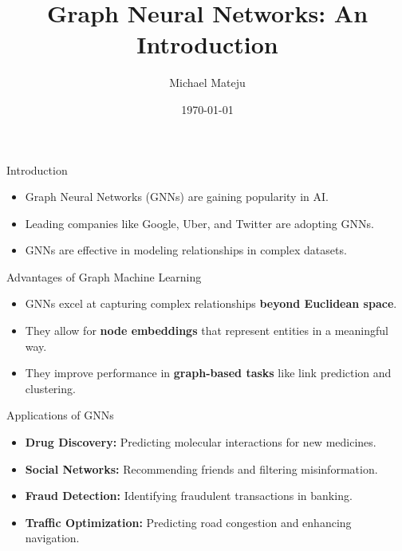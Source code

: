 \documentclass{beamer}
\title[Intro to GNN]{Graph Neural Networks: An Introduction}
\author{Michael Mateju}
\institute{Institute/Organization}
\date{\today}
\begin{document}
\frame{\titlepage}

\begin{frame}{Introduction}
    \begin{itemize}
        \item Graph Neural Networks (GNNs) are gaining popularity in AI.
        \item Leading companies like Google, Uber, and Twitter are adopting GNNs.
        \item GNNs are effective in modeling relationships in complex datasets.
    \end{itemize}
\end{frame}

\begin{frame}{Advantages of Graph Machine Learning}
    \begin{itemize}
        \item GNNs excel at capturing complex relationships \textbf{beyond Euclidean space}.
        \item They allow for \textbf{node embeddings} that represent entities in a meaningful way.
        \item They improve performance in \textbf{graph-based tasks} like link prediction and clustering.
    \end{itemize}
\end{frame}

\begin{frame}{Applications of GNNs}
    \begin{itemize}
        \item \textbf{Drug Discovery:} Predicting molecular interactions for new medicines.
        \item \textbf{Social Networks:} Recommending friends and filtering misinformation.
        \item \textbf{Fraud Detection:} Identifying fraudulent transactions in banking.
        \item \textbf{Traffic Optimization:} Predicting road congestion and enhancing navigation.
    \end{itemize}
\end{frame}
\end{document}
